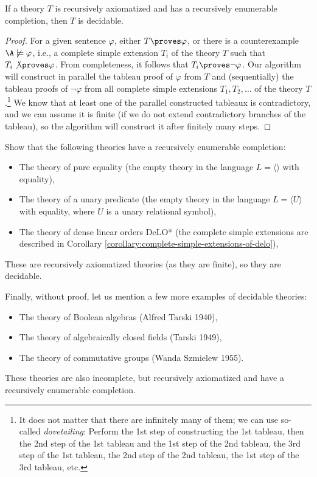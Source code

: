 \begin{proposition}\label{propositon:recursively-enumerable-completion}    
    If a theory $T$ is recursively axiomatized and has a recursively enumerable completion, then $T$ is decidable.
\end{proposition}
\begin{proof}
For a given sentence $\varphi$, either $T \proves \varphi$, or there is a counterexample $\A \not\models \varphi$, i.e., a complete simple extension $T_i$ of the theory $T$ such that $T_i \not\proves \varphi$. From completeness, it follows that $T_i \proves \neg \varphi$. Our algorithm will construct in parallel the tableau proof of $\varphi$ from $T$ and (sequentially) the tableau proofs of $\neg \varphi$ from all complete simple extensions $T_1, T_2, \dots$ of the theory $T$.\footnote{It does not matter that there are infinitely many of them; we can use so-called \emph{dovetailing}: Perform the 1st step of constructing the 1st tableau, then the 2nd step of the 1st tableau and the 1st step of the 2nd tableau, the 3rd step of the 1st tableau, the 2nd step of the 2nd tableau, the 1st step of the 3rd tableau, etc.} We know that at least one of the parallel constructed tableaux is contradictory, and we can assume it is finite (if we do not extend contradictory branches of the tableau), so the algorithm will construct it after finitely many steps.
\end{proof}

\begin{exercise}
Show that the following theories have a recursively enumerable completion:
\begin{itemize}
\item The theory of pure equality (the empty theory in the language $L = \langle \rangle$ with equality),
\item The theory of a unary predicate (the empty theory in the language $L = \langle U \rangle$ with equality, where $U$ is a unary relational symbol),
\item The theory of dense linear orders DeLO* (the complete simple extensions are described in Corollary \ref{corollary:complete-simple-extensions-of-delo}),
\end{itemize}
These are recursively axiomatized theories (as they are finite), so they are decidable.
\end{exercise}

\begin{example}
    Finally, without proof, let us mention a few more examples of decidable theories:
    \begin{itemize}  
        \item The theory of Boolean algebras (Alfred Tarski 1940),
        \item The theory of algebraically closed fields (Tarski 1949),
        \item The theory of commutative groups (Wanda Szmielew 1955).
    \end{itemize}
    These theories are also incomplete, but recursively axiomatized and have a recursively enumerable completion.    
\end{example}

